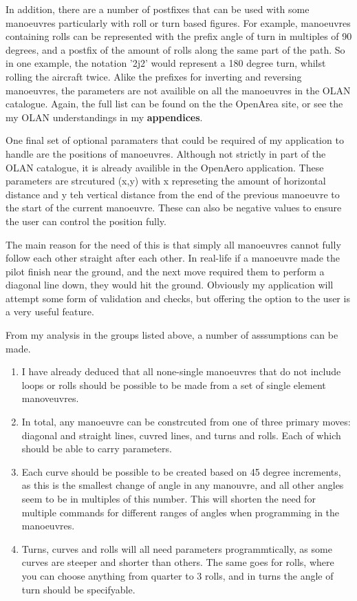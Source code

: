 In addition, there are a number of postfixes that can be used with some manoeuvres particularly with roll or turn based figures. For example, manoeuvres containing rolls can be represented with the prefix angle of turn in multiples of 90 degrees, and a postfix of the amount of rolls along the same part of the path. So in one example, the notation '2j2' would represent a 180 degree turn, whilst rolling the aircraft twice. Alike the prefixes for inverting and reversing manoeuvres, the parameters are not availible on all the manoeuvres in the OLAN catalogue. Again, the full list can be found on the the OpenArea site, or see the my OLAN understandings in my \textbf{appendices}.

One final set of optional paramaters that could be required of my application to handle are the positions of manoeuvres. Although not strictly in part of the OLAN catalogue, it is already availible in the OpenAero application. These parameters are strcutured (x,y) with x represeting the amount of horizontal distance and y teh vertical distance from the end of the previous manoeuvre to the start of the current manoeuvre. These can also be negative values to ensure the user can control the position fully. 

The main reason for the need of this is that simply all manoeuvres cannot fully follow each other straight after each other. In real-life if a manoeuvre made the pilot finish near the ground, and the next move required them to perform a diagonal line down, they would hit the ground. Obviously my application will attempt some form of validation and checks, but offering the option to the user is a very useful feature.

From my analysis in the groups listed above, a number of asssumptions can be made.
\begin{enumerate}
	\item I have already deduced that all none-single manoeuvres that do not include loops or rolls should be possible to be made from a set of single element manoveuvres.
	\item In total, any manoeuvre can be constrcuted from one of three primary moves: diagonal and straight lines, cuvred lines, and turns and rolls. Each of which should be able to carry parameters.
	\item Each curve should be possible to be created based on 45 degree increments, as this is the smallest change of angle in any manouvre, and all other angles seem to be in multiples of this number. This will shorten the need for multiple commands for different ranges of angles when programming in the manoeuvres.
	\item Turns, curves and rolls will all need parameters programmtically, as some curves are steeper and shorter than others. The same goes for rolls, where you can choose anything from quarter to 3 rolls, and in turns the angle of turn should be specifyable.
\end{enumerate}

